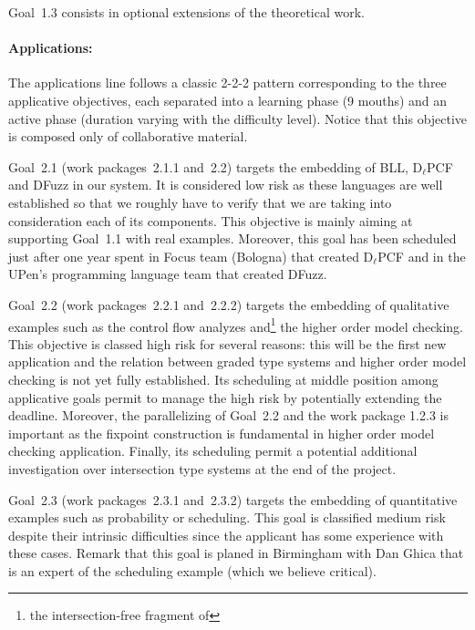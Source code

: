 \documentclass{article}[11pt]
\newcommand\BLL{BLL\xspace}
\newcommand\DlPCF{D$_\ell$PCF\xspace}
\newcommand\DFuzz{DFuzz\xspace}
\begin{document}
Goal~1.3 consists in optional extensions of the theoretical work.



\paragraph{Applications:}
The applications line follows a classic 2-2-2 pattern corresponding to the three applicative objectives, each separated into a learning phase (9 mouths) and an active phase (duration varying with the difficulty level). Notice that this objective is composed only of collaborative material.

Goal~2.1 (work packages~2.1.1 and~2.2) targets the embedding of \BLL, \DlPCF and \DFuzz in our system. It is considered low risk as these languages are well established so that we roughly have to verify that we are taking into consideration each of its components. This objective is mainly aiming at supporting Goal~1.1 with real examples. Moreover, this goal has been scheduled just after one year spent in Focus team (Bologna) that created \DlPCF and in the UPen's programming language team that created \DFuzz.

Goal~2.2 (work packages~2.2.1 and~2.2.2) targets the embedding of qualitative examples such as the control flow analyzes and\footnote{the intersection-free fragment of} the higher order model checking. This objective is classed high risk for several reasons: this will be the first new application and the relation between graded type systems and higher order model checking is not yet fully established. Its scheduling at middle position among applicative goals permit to manage the high risk by potentially extending the deadline. Moreover, the parallelizing of Goal~2.2 and the work package 1.2.3 is important as the fixpoint construction is fundamental in higher order model checking application. Finally, its scheduling permit a potential additional investigation over intersection type systems at the end of the project.

Goal~2.3 (work packages~2.3.1 and~2.3.2) targets the embedding of quantitative examples such as probability or scheduling. This goal is classified medium risk despite their intrinsic difficulties since the applicant has some experience with these cases. Remark that this goal is planed in Birmingham with Dan Ghica that is an expert of the scheduling example (which we believe critical). 
\end{document}
